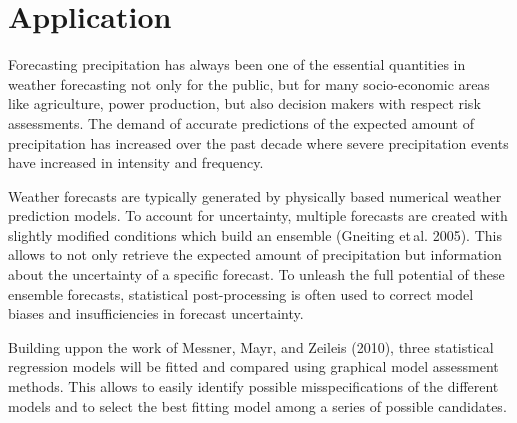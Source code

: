 \documentclass[twoside]{report}
\begin{document}

\maketitle



\section{Application}

Forecasting precipitation has always been one of the essential quantities in
weather forecasting not only for the public, but for many socio-economic areas
like agriculture, power production, but also decision makers with respect risk
assessments. 
The demand of accurate predictions of the expected amount of precipitation has
increased over the past decade where severe precipitation events have increased
in intensity and frequency.

Weather forecasts are typically generated by physically based numerical weather
prediction models. To account for uncertainty, multiple forecasts are created
with slightly modified conditions which build an ensemble (Gneiting et\,al.
2005). This allows to not only retrieve the expected amount of precipitation
but information about the uncertainty of a specific forecast.
To unleash the full potential of these ensemble forecasts, statistical
post-processing is often used to correct model biases and insufficiencies in
forecast uncertainty.

Building uppon the work of Messner, Mayr, and Zeileis (2010), three statistical
regression models will be fitted and compared using
graphical model assessment methods.
This allows to easily identify possible misspecifications of the different
models and to select the best fitting model among a series of possible candidates.


\end{document}
